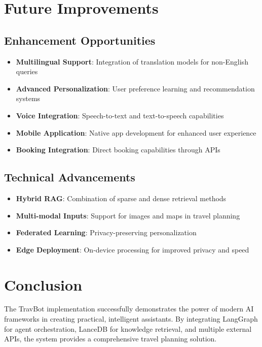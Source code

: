 \documentclass[12pt,a4paper]{article}
\begin{document}
\section{Future Improvements}

\subsection{Enhancement Opportunities}
\begin{itemize}
\item \textbf{Multilingual Support}: Integration of translation models for non-English queries
\item \textbf{Advanced Personalization}: User preference learning and recommendation systems
\item \textbf{Voice Integration}: Speech-to-text and text-to-speech capabilities
\item \textbf{Mobile Application}: Native app development for enhanced user experience
\item \textbf{Booking Integration}: Direct booking capabilities through APIs
\end{itemize}

\subsection{Technical Advancements}
\begin{itemize}
\item \textbf{Hybrid RAG}: Combination of sparse and dense retrieval methods
\item \textbf{Multi-modal Inputs}: Support for images and maps in travel planning
\item \textbf{Federated Learning}: Privacy-preserving personalization
\item \textbf{Edge Deployment}: On-device processing for improved privacy and speed
\end{itemize}

\section{Conclusion}

The TravBot implementation successfully demonstrates the power of modern AI frameworks in creating practical, intelligent assistants. By integrating LangGraph for agent orchestration, LanceDB for knowledge retrieval, and multiple external APIs, the system provides a comprehensive travel planning solution.
\end{document}
